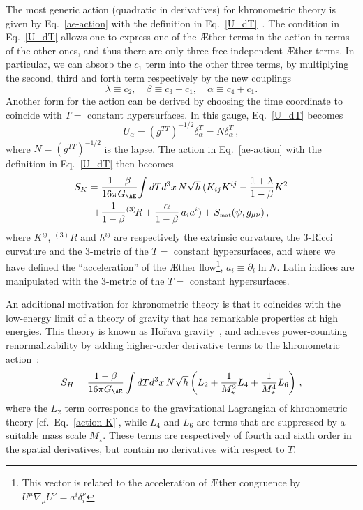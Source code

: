 \documentclass[prd,aps,twocolumn,nofootinbib,showpacs,superscriptaddress]{revtex4-1}
\newcommand\be{\begin{equation}}
\newcommand\ee{\end{equation}}
\def\m{\mu}
\def\n{\nu}
\newcommand{\MAT}{{\mbox{\tiny mat}}}
\begin{document}
The most generic action (quadratic in derivatives)
for khronometric theory
is given by Eq.~\eqref{ae-action} with the definition in Eq.~\eqref{U_dT}~\cite{Jacobson:2010mx,Blas:2010hb}.
The condition in Eq.~\eqref{U_dT} allows one to express one of the \AE ther terms in the action 
in terms of the other ones, and thus there are only three free independent \AE ther  terms. 
In particular, we can absorb the $c_1$ term into the other three terms, by multiplying the second, third and forth term respectively by the new couplings
\be\label{eq:EAtoKH}
\lambda\equiv c_2, \quad \beta\equiv c_3+c_1, \quad \alpha\equiv c_4+c_1.
\ee
Another form for the action can be derived by choosing the time coordinate to 
coincide with  $T=$ constant hypersurfaces. In this gauge, 
Eq.~\eqref{U_dT} becomes 
\be\label{U_lapse}
U_\alpha= (g^{TT})^{-1/2}\delta_{\alpha}^{T}=N\delta_{\alpha}^{T}  \,,
\ee
where $N=(g^{TT})^{-1/2}$ is the lapse. The action in Eq.~\eqref{ae-action} with the definition
in Eq.~\eqref{U_dT} then becomes 
\cite{Blas:2009ck}
\begin{multline}\label{action-K}
S_{K}=\frac{1-\beta}{16\pi G_{\AE}}\!\int dT d^3x \, N\sqrt{h} \, (K_{ij}K^{ij} - \frac{1+\lambda}{1-\beta} K^2
\\+  \frac{1}{1-\beta}{}^{(3)}\!R +  \frac{\alpha}{1-\beta}\, a_ia^i)+S_{\MAT}(\psi,g_{\mu\nu})\,,
\end{multline}
where $K^{ij}$, ${}^{(3)}\!R$ and $h^{ij}$ are respectively the extrinsic curvature, the $3$-Ricci curvature
and the 3-metric of the $T=$ constant hypersurfaces, and where we have defined the ``acceleration'' of the \AE ther flow\footnote{This vector is related
to the acceleration of \AE ther congruence  by $U^\m \nabla_\m U^\n=a^i \delta_i^\n$}, $a_i\equiv\partial_i \ln{N}$. Latin indices are manipulated
with the 3-metric of the $T=$ constant hypersurfaces.

An additional motivation for khronometric theory is that it coincides with the low-energy limit of a theory of
gravity that has remarkable properties at high energies. This theory is known as  Ho\v rava gravity~\cite{Horava:2009uw}, and achieves 
power-counting renormalizability by adding higher-order derivative terms to the khronometric action~\cite{Horava:2009uw,Blas:2009qj}:
\be
\label{action-H-full}
S_{H}= \frac{1-\beta}{16\pi G_{\AE}}\int dT d^3x \, N\sqrt{h}\left(L_2+\frac{1}{M_\star^2}L_4+\frac{1}{M_\star^4}L_6\right)\,,
\ee
where the $L_2$ term corresponds to the gravitational Lagrangian of 
 khronometric theory [cf.~Eq.~\eqref{action-K}], while 
$L_4$ and $L_6$ are terms that are suppressed by a suitable mass scale $M_\star$. These terms are respectively of fourth and sixth order in the spatial derivatives, but contain no derivatives with respect to $T$. 
\end{document}

